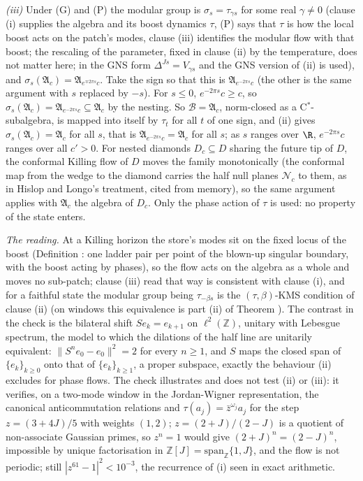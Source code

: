 \emph{(iii)} Under (G) and (P) the modular group is $\sigma_{s} = \tau_{\gamma s}$ for some real $\gamma \ne 0$ (clause (i) supplies the algebra and its boost dynamics $\tau$, (P) says that $\tau$ is how the local boost acts on the patch's modes, clause (iii) identifies the modular flow with that boost; the rescaling of the parameter, fixed in clause (ii) by the temperature, does not matter here; in the GNS form $\Delta^{Js} = V_{\gamma s}$ and the GNS version of (ii) is used), and $\sigma_{s}(\mathfrak{A}_{c}) = \mathfrak{A}_{e^{\mp 2\pi s}c}$. Take the sign so that this is $\mathfrak{A}_{e^{-2\pi s}c}$ (the other is the same argument with $s$ replaced by $-s$). For $s \le 0$, $e^{-2\pi s}c \ge c$, so $\sigma_{s}(\mathfrak{A}_{c}) = \mathfrak{A}_{e^{-2\pi s}c} \subseteq \mathfrak{A}_{c}$ by the nesting. So $\mathcal{B} = \mathfrak{A}_{c}$, norm-closed as a C$^{*}$-subalgebra, is mapped into itself by $\tau_{t}$ for all $t$ of one sign, and (ii) gives $\sigma_{s}(\mathfrak{A}_{c}) = \mathfrak{A}_{c}$ for all $s$, that is $\mathfrak{A}_{e^{-2\pi s}c} = \mathfrak{A}_{c}$ for all $s$; as $s$ ranges over $\R$, $e^{-2\pi s}c$ ranges over all $c' > 0$. For nested diamonds $D_{c} \subseteq D$ sharing the future tip of $D$, the conformal Killing flow of $D$ moves the family monotonically (the conformal map from the wedge to the diamond carries the half null planes $\mathcal{N}_{c}$ to them, as in Hislop and Longo's treatment, cited from memory), so the same argument applies with $\mathfrak{A}_{c}$ the algebra of $D_{c}$. Only the phase action of $\tau$ is used: no property of the state enters.

\emph{The reading.} At a Killing horizon the store's modes sit on the fixed locus of the boost (Definition : one ladder pair per point of the blown-up singular boundary, with the boost acting by phases), so the flow acts on the algebra as a whole and moves no sub-patch; clause (iii) read that way is consistent with clause (i), and for a faithful state the modular group being $\tau_{-\beta s}$ is the $(\tau, \beta)$-KMS condition of clause (ii) (on windows this equivalence is part (ii) of Theorem ). The contrast in the check is the bilateral shift $S e_{k} = e_{k + 1}$ on $\ell^{2}(\mathbb{Z})$, unitary with Lebesgue spectrum, the model to which the dilations of the half line are unitarily equivalent: $\|S^{n}e_{0} - e_{0}\|^{2} = 2$ for every $n \ge 1$, and $S$ maps the closed span of $\{e_{k}\}_{k \ge 0}$ onto that of $\{e_{k}\}_{k \ge 1}$, a proper subspace, exactly the behaviour (ii) excludes for phase flows. The check illustrates and does not test (ii) or (iii): it verifies, on a two-mode window in the Jordan-Wigner representation, the canonical anticommutation relations and $\tau(a_{j}) = \bar z^{\omega_{j}}a_{j}$ for the step $z = (3 + 4J)/5$ with weights $(1, 2)$; $z = (2 + J)/(2 - J)$ is a quotient of non-associate Gaussian primes, so $z^{n} = 1$ would give $(2 + J)^{n} = (2 - J)^{n}$, impossible by unique factorisation in $\mathbb{Z}[J] = \mathrm{span}_{\mathbb{Z}}\{1, J\}$, and the flow is not periodic; still $|z^{61} - 1|^{2} < 10^{-3}$, the recurrence of (i) seen in exact arithmetic.
